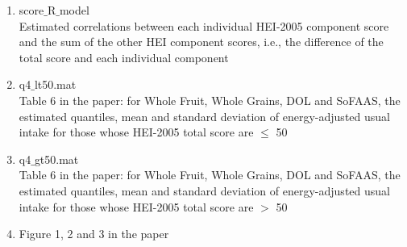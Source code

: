 \documentclass[12pt]{article}
\begin{document}
\begin{itemize}
\begin{enumerate}
\item score$\_$R$\_$model\\
Estimated correlations between each individual HEI-2005 component score and the sum of the other HEI component scores, i.e., the difference of the total score and each individual component

\item	 q4$\_$lt50.mat\\
Table 6 in the paper: for Whole Fruit, Whole Grains, DOL and SoFAAS, the estimated quantiles, mean and standard deviation of energy-adjusted usual intake for those whose HEI-2005 total score are $\le$ 50 

\item q4$\_$gt50.mat\\
Table 6 in the paper: for Whole Fruit, Whole Grains, DOL and SoFAAS, the estimated quantiles, mean and standard deviation of energy-adjusted usual intake for those whose HEI-2005 total score are $>$ 50 

\item Figure 1, 2 and 3 in the paper
\end{enumerate}
\end{itemize}
\end{document}
